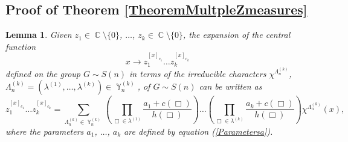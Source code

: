 \documentclass[12pt]{amsart}
\newtheorem{lem}[thm]{Lemma}
\theoremstyle{definition}
\numberwithin{equation}{section}
\DeclareMathOperator{\Y}{\mathbb{Y}}
\DeclareMathOperator{\C}{\mathbb{C}}
\begin{document}
\subsection{Proof of Theorem \ref{TheoremMultpleZmeasures}}
\begin{lem}\label{LEMMAZCYCLES}Given  $z_1\in\C\setminus\{0\}$, $\ldots$, $z_k\in\C\setminus\{0\}$, the expansion of the central function
$$
x\longrightarrow z_1^{[x]_{c_1}}\ldots z_k^{[x]_{c_k}}
$$
defined on the group $G\sim S(n)$ in terms of the irreducible characters $\chi^{\Lambda_n^{(k)}}$, $\Lambda_n^{(k)}=\left(\lambda^{(1)},\ldots,\lambda^{(k)}\right)\in\Y_n^{(k)}$,
of $G\sim S(n)$
can be written as
\begin{equation}\label{EqMainLemmZ}
z_1^{[x]_{c_1}}\ldots z_k^{[x]_{c_k}}=
\sum\limits_{\Lambda_n^{(k)}\in\Y_n^{(k)}}
\left(\prod\limits_{\Box\in\lambda^{(1)}}\frac{a_1+c(\Box)}{h(\Box)}\right)
\ldots\left(\prod\limits_{\Box\in\lambda^{(k)}}\frac{a_k+c(\Box)}{h(\Box)}\right)
\chi^{\Lambda_n^{(k)}}(x),
\end{equation}
where the parameters $a_1$, $\ldots$, $a_k$ are defined by equation (\ref{Parametersa}).
\end{lem}
\end{document}
